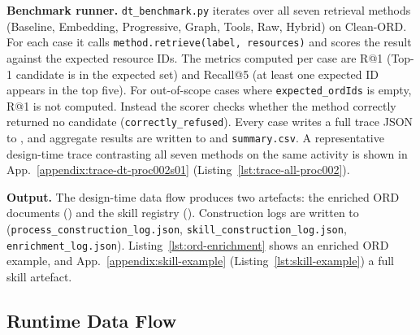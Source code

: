 \textbf{Benchmark runner.} \texttt{dt\_benchmark.py} iterates over all seven retrieval methods (Baseline, Embedding, Progressive, Graph, Tools, Raw, Hybrid) on Clean-ORD. For each case it calls \texttt{method.retrieve(label, resources)} and scores the result against the expected resource IDs. The metrics computed per case are R@1 (Top-1 candidate is in the expected set) and Recall@5 (at least one expected ID appears in the top five). For out-of-scope cases where \texttt{expected\_ordIds} is empty, R@1 is not computed. Instead the scorer checks whether the method correctly returned no candidate (\texttt{correctly\_refused}). Every case writes a full trace JSON to , and aggregate results are written to  and \texttt{summary.csv}. A representative design-time trace contrasting all seven methods on the same activity is shown in App.~\ref{appendix:trace-dt-proc002s01} (Listing~\ref{lst:trace-all-proc002}).




\textbf{Output.} The design-time data flow produces two artefacts: the enriched ORD documents () and the skill registry (). Construction logs are written to  (\texttt{process\_construction\_log.json}, \texttt{skill\_construction\_log.json}, \texttt{enrichment\_log.json}). Listing~\ref{lst:ord-enrichment} shows an enriched ORD example, and App.~\ref{appendix:skill-example} (Listing~\ref{lst:skill-example}) a full skill artefact.


\subsection{Runtime Data Flow}
\label{appendix:runtime-impl}

